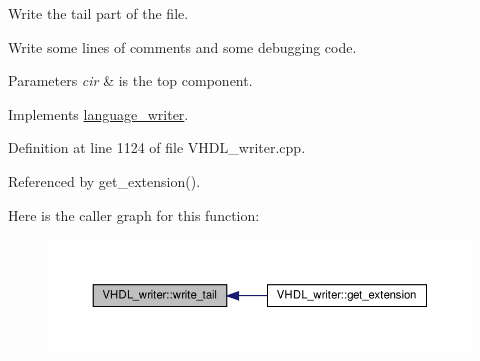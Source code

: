 Write the tail part of the file. 

Write some lines of comments and some debugging code. 
\begin{DoxyParams}{Parameters}
{\em cir} & is the top component. \\
\hline
\end{DoxyParams}


Implements \hyperlink{classlanguage__writer_aa244ceb9a8c0033a75c5b885df4693c8}{language\+\_\+writer}.



Definition at line 1124 of file V\+H\+D\+L\+\_\+writer.\+cpp.



Referenced by get\+\_\+extension().

Here is the caller graph for this function\+:
\nopagebreak
\begin{figure}[H]
\begin{center}
\leavevmode
\includegraphics[width=350pt]{d0/d0c/structVHDL__writer_aaba770cf999a1be1ead3e65623adc02f_icgraph}
\end{center}
\end{figure}
\mbox{\label{structVHDL__writer_a8a3178b0a3f07604df38e02882851374}} 
